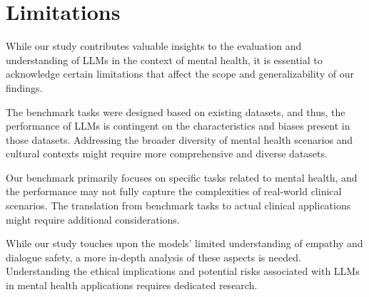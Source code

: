 
\section{Limitations}

While our study contributes valuable insights to the evaluation and understanding of LLMs in the context of mental health, it is essential to acknowledge certain limitations that affect the scope and generalizability of our findings.

The benchmark tasks were designed based on existing datasets, and thus, the performance of LLMs is contingent on the characteristics and biases present in those datasets. Addressing the broader diversity of mental health scenarios and cultural contexts might require more comprehensive and diverse datasets.

Our benchmark primarily focuses on specific tasks related to mental health, and the performance may not fully capture the complexities of real-world clinical scenarios. The translation from benchmark tasks to actual clinical applications might require additional considerations.

While our study touches upon the models' limited understanding of empathy and dialogue safety, a more in-depth analysis of these aspects is needed. Understanding the ethical implications and potential risks associated with LLMs in mental health applications requires dedicated research.